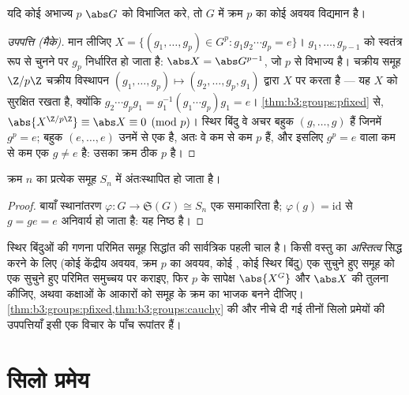 \begin{theorem}[कोशी]\label{thm:b3:groups:cauchy}
यदि कोई अभाज्य $p$ $\abs G$ को विभाजित करे, तो $G$ में क्रम
$p$ का कोई अवयव विद्यमान है।
\end{theorem}

\begin{proof}[उपपत्ति (मैके)]
मान लीजिए $X = \{(g_1, \dots, g_p) \in G^p : g_1 g_2 \cdots g_p = e\}$। $g_1, \dots, g_{p-1}$ को स्वतंत्र रूप से चुनने पर $g_p$ निर्धारित
हो जाता है: $\abs X =
\abs G^{p-1}$, जो $p$ से विभाज्य है। चक्रीय समूह $\Z/p\Z$
चक्रीय विस्थापन $(g_1, \dots, g_p) \mapsto (g_2, \dots, g_p,
g_1)$ द्वारा $X$ पर  करता है --- यह
$X$ को सुरक्षित रखता है, क्योंकि $g_2 \cdots g_p g_1 =
g_1^{-1}(g_1 \cdots g_p)g_1 = e$। \cref{thm:b3:groups:pfixed} से, $\abs{X^{\Z/p\Z}} \equiv \abs X \equiv 0 \pmod p$।
स्थिर बिंदु वे अचर बहुक $(g, \dots, g)$ हैं जिनमें $g^p = e$; बहुक $(e,
\dots, e)$
उनमें से एक है, अतः वे कम से कम $p$ हैं, और इसलिए $g^p = e$ वाला
कम से कम एक $g \neq e$ है: उसका क्रम ठीक $p$ है।
\end{proof}

\begin{theorem}[केली]\label{thm:b3:groups:cayley}
क्रम $n$ का प्रत्येक समूह $S_n$ में अंतःस्थापित हो जाता
है।
\end{theorem}

\begin{proof}
बायाँ स्थानांतरण $\varphi \colon G \to \mathfrak S(G) \cong S_n$ एक समाकारिता है; $\varphi(g) = \mathrm{id}$ से $g = ge = e$ अनिवार्य
हो जाता है: यह निष्ठ है।
\end{proof}

\begin{method}\label{met:b3:groups:counting}
स्थिर बिंदुओं की गणना परिमित समूह सिद्धांत की सार्वत्रिक पहली
चाल है। किसी वस्तु का \emph{अस्तित्व} सिद्ध करने के लिए (कोई
केंद्रीय अवयव, क्रम $p$ का अवयव, कोई , कोई
स्थिर बिंदु) एक सुचुने हुए समूह को एक सुचुने हुए परिमित समुच्चय
पर  कराइए, फिर $p$ के सापेक्ष $\abs{X^G}$ और $\abs X$ की तुलना
कीजिए, अथवा कक्षाओं के आकारों को समूह के क्रम का भाजक बनने
दीजिए। \cref{thm:b3:groups:pfixed,thm:b3:groups:cauchy} की और नीचे दी गई तीनों सिलो प्रमेयों की उपपत्तियाँ
इसी एक विचार के पाँच रूपांतर हैं।
\end{method}

\section{सिलो प्रमेय}

